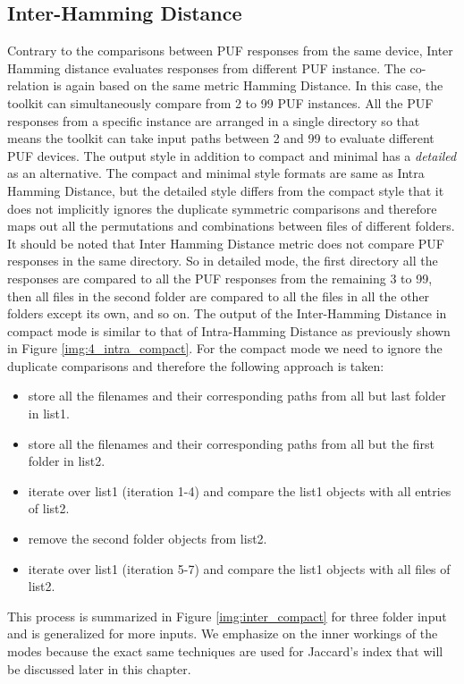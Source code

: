 \subsection{Inter-Hamming Distance}
\label{inter_hd_section}
Contrary to the comparisons between PUF responses from the same device, Inter Hamming distance evaluates responses from different PUF instance. The co-relation is again based on the same metric Hamming Distance. In this case, the toolkit can simultaneously compare from 2 to 99 PUF instances. All the PUF responses from a specific instance are arranged in a single directory so that means the toolkit can take input paths between 2 and 99 to evaluate different PUF devices. The output
style in addition to compact and minimal has a \emph{detailed} as an alternative. The compact and minimal style formats are same as Intra Hamming Distance, but the detailed style differs from the compact style that it does not implicitly ignores the duplicate symmetric comparisons and therefore maps out all the permutations and combinations between files of different folders. It should be noted that Inter Hamming Distance metric does not compare PUF responses in the same directory. So
in detailed mode, the first directory all the responses are compared to all the PUF responses from the remaining 3 to 99, then all files in the second folder are compared to all the files in all the other folders except its own, and so on. The output of the Inter-Hamming Distance in compact mode is similar to that of Intra-Hamming Distance as previously shown in Figure \ref{img:4_intra_compact}. For the compact mode we need to ignore the duplicate comparisons and therefore the following approach is
taken:

\begin{itemize}
	\item store all the filenames and their corresponding paths from all but last folder in list1.
	\item store all the filenames and their corresponding paths from all but the first folder in list2.
	\item iterate over list1 (iteration 1-4) and compare the list1 objects with all entries of list2.
	\item remove the second folder objects from list2.
	\item iterate over list1 (iteration 5-7) and compare the list1 objects with all files of list2.
\end{itemize}

This process is summarized in Figure \ref{img:inter_compact} for three folder input and is generalized for more inputs. We emphasize on the inner workings of the modes because the exact same techniques are used for Jaccard's index that will be discussed later in this chapter.\\

